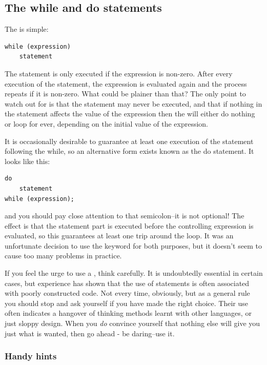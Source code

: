   

  \subsection{The while and do statements}
   

   The \while{} is simple:


   \begin{Verbatim}
while (expression)
    statement
\end{Verbatim}

   The statement is only executed if the expression
    is non-zero. After every execution of the statement, the
    expression is evaluated again and the process repeats if it is
    non-zero. What could be plainer than that? The only point to watch out for
    is that the statement may never be executed, and that if
    nothing in the statement affects the value of the expression
    then the \while{} will either do nothing or loop for ever,
    depending on the initial value of the expression.


   It is occasionally desirable to guarantee at least one execution of the
    statement following the while, so an alternative form exists known as the
    do statement. It looks like this:


   \begin{Verbatim}
do
    statement
while (expression);
\end{Verbatim}

   and you should pay close attention to that semicolon--it is not
    optional! The effect is that the statement part is executed before the
    controlling expression is evaluated, so this guarantees at least one trip
    around the loop. It was an unfortunate decision to use the keyword
    \while{} for both purposes, but it doesn't seem to cause too
    many problems in practice.


   If you feel the urge to use a \kdo, think carefully. It is
    undoubtedly essential in certain cases, but experience has shown that the
    use of \kdo{} statements is often associated with poorly
    constructed code. Not every time, obviously, but as a general rule you
    should stop and ask yourself if you have made the right choice. Their use
    often indicates a hangover of thinking methods learnt with other
    languages, or just sloppy design. When you \textit{do} convince yourself
    that nothing else will give you just what is wanted, then go ahead - be
    daring--use it.


   \subsubsection{Handy hints}
    

